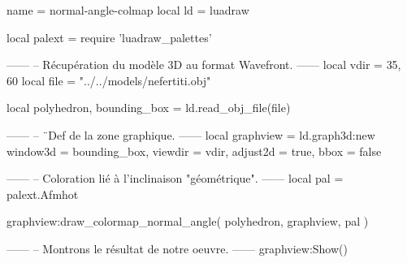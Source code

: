 \documentclass[border = 3pt]{standalone}
\begin{document}
\begin{luadraw*}{name = normal-angle-colmap}
local ld = luadraw

local palext = require 'luadraw_palettes'

------
-- Récupération du modèle 3D au format Wavefront.
------
local vdir = {35, 60}
local file = "../../models/nefertiti.obj"

local polyhedron, bounding_box = ld.read_obj_file(file)


------
-- ¨Def de la zone graphique.
------
local graphview = ld.graph3d:new{
  window3d = bounding_box,
  viewdir  = vdir,
  adjust2d = true,
  bbox     = false
}

------
-- Coloration lié à l'inclinaison "géométrique".
------
local pal = palext.Afmhot

graphview:draw_colormap_normal_angle(
  polyhedron,
  graphview,
  pal
)

------
-- Montrons le résultat de notre oeuvre.
------
graphview:Show()
\end{luadraw*}
\end{document}
